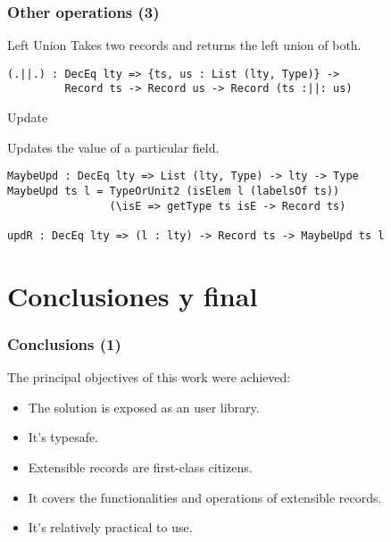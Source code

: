 \documentclass{beamer}
\begin{document}
\begin{frame}[fragile]
\frametitle{Other operations (3)}

\begin{block}{Left Union}
Takes two records and returns the left union of both.

\begin{definition}
\begin{verbatim}
(.||.) : DecEq lty => {ts, us : List (lty, Type)} -> 
         Record ts -> Record us -> Record (ts :||: us)
\end{verbatim}
\end{definition}

\end{block}

\begin{block}{Update}

Updates the value of a particular field.

\begin{definition}
\begin{verbatim}
MaybeUpd : DecEq lty => List (lty, Type) -> lty -> Type
MaybeUpd ts l = TypeOrUnit2 (isElem l (labelsOf ts))
                (\isE => getType ts isE -> Record ts)

updR : DecEq lty => (l : lty) -> Record ts -> MaybeUpd ts l
\end{verbatim}
\end{definition}

\end{block}
\end{frame}

\section{Conclusiones y final}

\begin{frame}
\frametitle{Conclusions (1)}

The principal objectives of this work were achieved:

\begin{itemize}
\item The solution is exposed as an user library.
\item It's typesafe.
\item Extensible records are first-class citizens.
\item It covers the functionalities and operations of extensible records.
\item It's relatively practical to use.
\end{itemize}

\end{frame}
\end{document}
